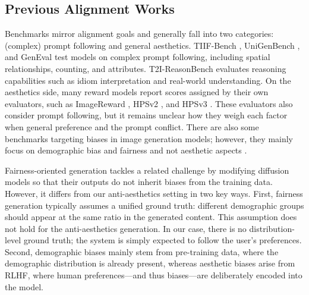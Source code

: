 \subsection{Previous Alignment Works}
Benchmarks mirror alignment goals and generally fall into two categories: (complex) prompt following and general aesthetics. TIIF-Bench \cite{wei_tiif-bench_2025}, UniGenBench \cite{wang_pref-grpo_2025}, and GenEval \cite{ghosh_geneval_2023} test models on complex prompt following, including spatial relationships, counting, and attributes. T2I-ReasonBench \cite{sun_t2i-reasonbench_2025} evaluates reasoning capabilities such as idiom interpretation and real-world understanding. On the aesthetics side, many reward models report scores assigned by their own evaluators, such as ImageReward \cite{xu_imagereward_2023}, HPSv2 \cite{wu_human_2023}, and HPSv3 \cite{ma_hpsv3_2025}. These evaluators also consider prompt following, but it remains unclear how they weigh each factor when general preference and the prompt conflict. There are also some benchmarks targeting biases in image generation models; however, they mainly focus on demographic bias and fairness and not aesthetic aspects \cite{seshadri_bias_2023, wan_survey_2024}. 

Fairness-oriented generation \cite{friedrich_fair_2023, gandikota_unified_2024, noauthor_231107604_nodate, han_lightfair_2025} tackles a related challenge by modifying diffusion models so that their outputs do not inherit biases from the training data. However, it differs from our anti-aesthetics setting in two key ways. First, fairness generation typically assumes a unified ground truth: different demographic groups should appear at the same ratio in the generated content. This assumption does not hold for the anti-aesthetics generation. In our case, there is no distribution-level ground truth; the system is simply expected to follow the user’s preferences. Second, demographic biases mainly stem from pre-training data, where the demographic distribution is already present, whereas aesthetic biases arise from RLHF, where human preferences—and thus biases—are deliberately encoded into the model.




